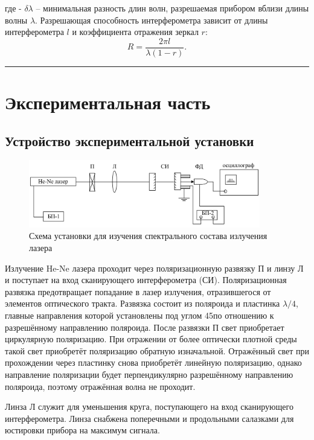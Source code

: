 \documentclass[a4paper,12pt]{article} %
\begin{document}
\noindent где - $\delta \lambda$ -- минимальная разность длин волн, разрешаемая прибором вблизи длины волны $\lambda$. Разрешающая способность интерферометра зависит от длины интерферометра $l$ и коэффициента отражения зеркал $r$:
\begin{equation}
R = \frac{2\pi l}{\lambda ( 1 - r )}.
\label{e:res2}
\end{equation}

\medskip\hrule\medskip

\FloatBarrier 

\section{Экспериментальная часть}

\subsection{Устройство экспериментальной установки}

\begin{figure}
\centering
\includegraphics[width=0.9\textwidth]{setup.jpg}
\caption{Схема установки для изучения спектрального состава излучения лазера}
\label{setup}
\end{figure}

Излучение He-Ne лазера проходит через поляризационную развязку П и линзу Л и поступает на вход сканирующего интерферометра (СИ). Поляризационная развязка предотвращает попадание в лазер излучения, отразившегося от элементов оптического тракта. Развязка состоит из поляроида и пластинка $\lambda/4$, главные направления которой установлены под углом 45\degree по отношению к разрешённому направлению поляроида. После развязки П свет приобретает циркулярную поляризацию. При отражении от более оптически плотной среды такой свет приобретёт поляризацию обратную изначальной. Отражённый свет при прохождении через пластинку снова приобретёт линейную поляризацию, однако направление поляризации будет перпендикулярно разрешённому направлению поляроида, поэтому отражённая волна не проходит.

Линза Л служит для уменьшения круга, поступающего на вход сканирующего интерферометра. Линза снабжена поперечными и продольными салазками для юстировки прибора на максимум сигнала.
\end{document}
